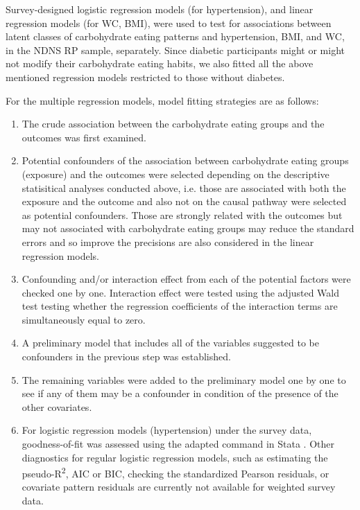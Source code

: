 

Survey-designed logistic regression models (for hypertension), and linear regression models (for WC, BMI), were used to test for associations between latent classes of carbohydrate eating patterns and hypertension, BMI, and WC, in the NDNS RP sample, separately. Since diabetic participants might or might not modify their carbohydrate eating habits, we also fitted all the above mentioned regression models restricted to those without diabetes.

For the multiple regression models, model fitting strategies are as follows: 

\begin{enumerate}
	\item The crude association between the carbohydrate eating groups and the outcomes was first examined. 
	\item Potential confounders of the association between carbohydrate eating groups (exposure) and the outcomes were selected depending on the descriptive statisitical analyses conducted above, i.e. those are associated with both the exposure and the outcome and also not on the causal pathway were selected as potential confounders. Those are strongly related with the outcomes but may not associated with carbohydrate eating groups may reduce the standard errors and so improve the precisions are also considered in the linear regression models. 
	\item Confounding and/or interaction effect from each of the potential factors were checked one by one. Interaction effect were tested using the adjusted Wald test testing whether the regression coefficients of the interaction terms are simultaneously equal to zero.  
	\item A preliminary model that includes all of the variables suggested to be confounders in the previous step was established. 
	\item The remaining variables were added to the preliminary model one by one to see if any of them may be a confounder in condition of the presence of the other covariates. 
	\item For logistic regression models (hypertension) under the survey data, goodness-of-fit was assessed using the adapted  command in Stata \parencite{archer2006goodness}. Other diagnostics for regular logistic regression models, such as estimating the pseudo-R\textsuperscript{2},  AIC or BIC, checking the standardized Pearson residuals, or covariate pattern residuals are currently not available for weighted survey data. 

\end{enumerate}
